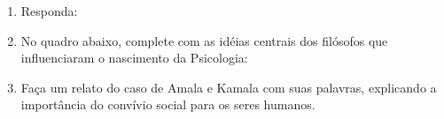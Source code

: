 \documentclass[a4paper, 12pt]{article}
\begin{document}
 \begin{enumerate}
   \item Responda:
   \item No quadro abaixo, complete com as idéias centrais dos filósofos que influenciaram o nascimento da Psicologia:
   \item Faça um relato do caso de Amala e Kamala com suas palavras, explicando a importância do convívio social para os seres humanos.
 \end{enumerate}
\end{document}
